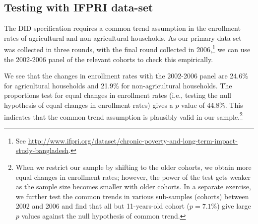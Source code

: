 \documentclass[12pt,letterpaper]{article}
\newcommand{\0}{\ensuremath{\mbox{\boldmath $0$}}}
\begin{document}
\subsection{Testing with IFPRI data-set}

The DID specification requires a common trend assumption in the enrollment rates of agricultural and non-agricultural households. As our primary data set was collected in three rounds, with the final round collected in 2006,\footnote{See \url{http://www.ifpri.org/dataset/chronic-poverty-and-long-term-impact-study-bangladesh}.} we can use the 2002-2006 panel of the relevant cohorts to check this empirically. 


We see that the changes in enrollment rates with the 2002-2006 panel are 24.6\% for agricultural households and 21.9\% for non-agricultural households. The proportions test for equal changes in enrollment rates (i.e., testing the null hypothesis of equal changes in enrollment rates) gives a $p$ value of 44.8\%.
This indicates that the common trend assumption is plausibly valid in our sample.\footnote{When we restrict our sample by shifting to the older cohorts, we obtain more equal changes in enrollment rates; however, the power of the test gets weaker as the sample size becomes smaller with older cohorts. In a separate exercise, we further test the common trends in various sub-samples (cohorts) between 2002 and 2006 and find that all but 11-years-old cohort ($p=7.1\%$) give large $p$ values against the null hypothesis of common trend.}

\end{document}
